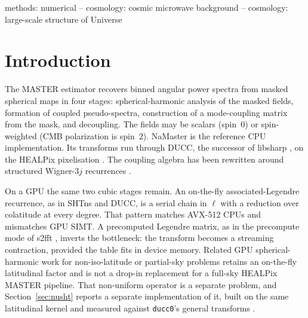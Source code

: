 \documentclass[usenatbib,useAMS]{mnras}
\begin{document}
\begin{abstract}
$N_{\mathrm{side}}=1024$--$4096$. The polarised $N_{\mathrm{side}}=4096$ pipeline finishes in $8.8\,\mathrm{s}$, where stock NaMaster cannot run at all. With the reference pinned to 32 cores the same board is $19.5$--$59.6\times$. The exact float64 route is one flag away and still reproduces $4.8\times10^{-13}$ at $N_{\mathrm{side}}=256$ spin~$0$. The same march also serves a second operator, the general (non-uniform) transform of a band-limited field at arbitrary points and its adjoint, through a double-Fourier-sphere factorisation and cufinufft: it is $2.8$--$6.0\times$ CPU \texttt{ducc0} on synthesis and $2.7$--$5.1\times$ on the adjoint at $\epsilon_{\mathrm{eff}}\sim10^{-6}$ to $2\times10^{-5}$, a regime in which \texttt{ducc0} is the more accurate code by $1.3$--$5\times$ and can go on to $10^{-13}$ where GMaster cannot. No other GPU spherical-harmonic code was timed, and no claim is made against one.
\end{abstract}

\begin{keywords}
methods: numerical -- cosmology: cosmic microwave background -- cosmology: large-scale structure of Universe
\end{keywords}

\section{Introduction}

The MASTER estimator \citep{hivon2002} recovers binned angular power spectra from masked spherical maps in four stages: spherical-harmonic analysis of the masked fields, formation of coupled pseudo-spectra, construction of a mode-coupling matrix from the mask, and decoupling. The fields may be scalars (spin~$0$) or spin-weighted (CMB polarization is spin~$2$). NaMaster \citep{alonso2019} is the reference CPU implementation. Its transforms run through DUCC, the successor of libsharp \citep{reinecke2013}, on the HEALPix pixelisation \citep{gorski2005}. The coupling algebra has been rewritten around structured Wigner-$3j$ recurrences \citep{kiddier2026}.

On a GPU the same two cubic stages remain. An on-the-fly associated-Legendre recurrence, as in SHTns \citep{schaeffer2013} and DUCC, is a serial chain in $\ell$ with a reduction over colatitude at every degree. That pattern matches AVX-512 CPUs and mismatches GPU SIMT. A precomputed Legendre matrix, as in the precompute mode of s2fft \citep{price2024}, inverts the bottleneck: the transform becomes a streaming contraction, provided the table fits in device memory. Related GPU spherical-harmonic work for non-iso-latitude or partial-sky problems \citep{belkner2024,carron2026} retains an on-the-fly latitudinal factor and is not a drop-in replacement for a full-sky HEALPix MASTER pipeline. That non-uniform operator is a separate problem, and Section~\ref{sec:nusht} reports a separate implementation of it, built on the same latitudinal kernel and measured against \texttt{ducc0}'s general transforms \citep{reinecke2023}.
\end{document}
